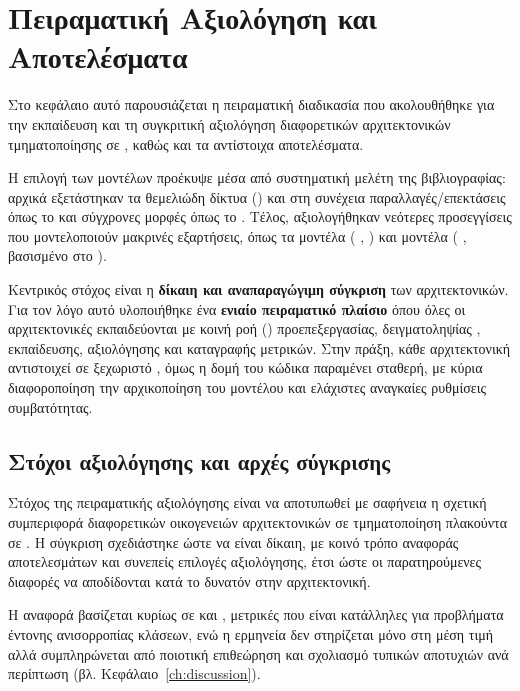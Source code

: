 \chapter{Πειραματική Αξιολόγηση και Αποτελέσματα}
\label{ch:experiments}

Στο κεφάλαιο αυτό παρουσιάζεται η πειραματική διαδικασία που ακολουθήθηκε
για την εκπαίδευση και τη συγκριτική αξιολόγηση διαφορετικών αρχιτεκτονικών
τμηματοποίησης σε , καθώς και τα αντίστοιχα αποτελέσματα.

Η επιλογή των μοντέλων προέκυψε μέσα από συστηματική μελέτη της βιβλιογραφίας:
αρχικά εξετάστηκαν τα θεμελιώδη  δίκτυα ()
\cite{ronneberger2015unet} και στη συνέχεια παραλλαγές/επεκτάσεις όπως το
 \cite{oktay2018attentionunet} και σύγχρονες  μορφές
όπως το  \cite{isensee2021nnunet}.
Τέλος, αξιολογήθηκαν νεότερες προσεγγίσεις που μοντελοποιούν μακρινές
εξαρτήσεις, όπως τα  μοντέλα
( \cite{hatamizadeh2022unetr},
 \cite{hatamizadeh2022swinunetr})
και  μοντέλα
( \cite{xing2024segmamba}, βασισμένο στο 
\cite{gu2023mamba}).

Κεντρικός στόχος είναι η \textbf{δίκαιη και αναπαραγώγιμη σύγκριση} των
αρχιτεκτονικών. Για τον λόγο αυτό υλοποιήθηκε ένα \textbf{ενιαίο πειραματικό
πλαίσιο} όπου όλες οι αρχιτεκτονικές εκπαιδεύονται με κοινή ροή
() προεπεξεργασίας, δειγματοληψίας , εκπαίδευσης,
αξιολόγησης και καταγραφής μετρικών.
Στην πράξη, κάθε αρχιτεκτονική αντιστοιχεί σε ξεχωριστό ,
όμως η δομή του κώδικα παραμένει σταθερή, με κύρια διαφοροποίηση την
αρχικοποίηση του μοντέλου και ελάχιστες αναγκαίες ρυθμίσεις συμβατότητας.

\section{Στόχοι αξιολόγησης και αρχές σύγκρισης}
\label{sec:exp_principles}

Στόχος της πειραματικής αξιολόγησης είναι να αποτυπωθεί με σαφήνεια η
σχετική συμπεριφορά διαφορετικών οικογενειών αρχιτεκτονικών σε τμηματοποίηση
πλακούντα σε . Η σύγκριση σχεδιάστηκε ώστε να είναι δίκαιη, με
κοινό τρόπο αναφοράς αποτελεσμάτων και συνεπείς επιλογές αξιολόγησης, έτσι
ώστε οι παρατηρούμενες διαφορές να αποδίδονται κατά το δυνατόν στην
αρχιτεκτονική.

Η αναφορά βασίζεται κυρίως σε  και , μετρικές που είναι
κατάλληλες για προβλήματα έντονης ανισορροπίας κλάσεων, ενώ η ερμηνεία δεν
στηρίζεται μόνο στη μέση τιμή αλλά συμπληρώνεται από ποιοτική επιθεώρηση και
σχολιασμό τυπικών αποτυχιών ανά περίπτωση (βλ. Κεφάλαιο~\ref{ch:discussion}).

